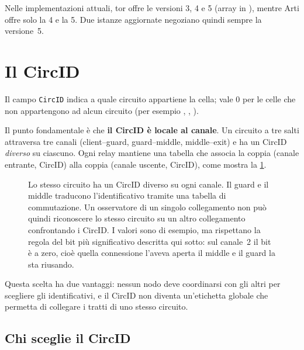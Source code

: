 Nelle implementazioni attuali, tor offre le versioni 3, 4 e 5 (array  in ), mentre Arti offre solo la 4 e la 5. Due istanze aggiornate negoziano quindi sempre la versione~5.

\section{Il CircID}\label{sec:circid}

Il campo \texttt{CircID} indica a quale circuito appartiene la cella; vale 0 per le celle che non appartengono ad alcun circuito (per esempio , , ).

Il punto fondamentale è che \textbf{il CircID è locale al canale}. Un circuito a tre salti attraversa tre canali (client--guard, guard--middle, middle--exit) e ha un CircID \emph{diverso} su ciascuno. Ogni relay mantiene una tabella che associa la coppia (canale entrante, CircID) alla coppia (canale uscente, CircID), come mostra la \cref{fig:circid-locale}.

\begin{figure}[htbp]
\centering

\caption{Lo stesso circuito ha un CircID diverso su ogni canale. Il guard e il middle traducono l'identificativo tramite una tabella di commutazione. Un osservatore di un singolo collegamento non può quindi riconoscere lo stesso circuito su un altro collegamento confrontando i CircID. I valori sono di esempio, ma rispettano la regola del bit più significativo descritta qui sotto: sul canale~2 il bit è a zero, cioè quella connessione l'aveva aperta il middle e il guard la sta riusando.}
\label{fig:circid-locale}
\end{figure}

Questa scelta ha due vantaggi: nessun nodo deve coordinarsi con gli altri per scegliere gli identificativi, e il CircID non diventa un'etichetta globale che permetta di collegare i tratti di uno stesso circuito.

\subsection{Chi sceglie il CircID}

